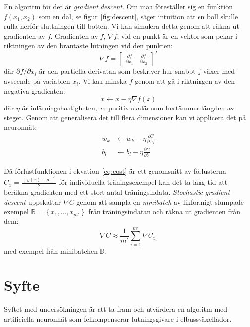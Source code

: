 En algoritm för det är \emph{gradient descent}.
Om man föreställer sig en funktion $ f(x_1, x_2) $ som en dal,
se figur~\ref{fig:descent},
säger intuition att en boll skulle rulla nerför sluttningen till botten.
Vi kan simulera detta genom att räkna ut gradienten av $ f $.
Gradienten av $ f $, $ \nabla f $, vid en punkt är en vektor
som pekar i riktningen av den brantaste lutningen vid den punkten:
\begin{equation}
	\nabla f = \begin{bmatrix} \frac{\partial f}{\partial x_1} & \frac{\partial f}{\partial x_2} \end{bmatrix}^{T}
\end{equation}
där $ \partial f / \partial x_i $ är den partiella derivatan
som beskriver hur snabbt $ f $ växer med avseende på variablen $ x_i $.
Vi kan minska $ f $ genom att gå i riktningen av den negativa gradienten:
\begin{equation}
	x \leftarrow x - \eta \nabla f(x)
\end{equation}
där $ \eta $ är inlärningshastigheten,
en positiv skalär som bestämmer längden av steget.
Genom att generalisera det till flera dimensioner kan vi
applicera det på neuronnät:
\begin{align}
	w_k &\leftarrow w_k - \eta \frac{\partial C}{\partial w_k} \\
	b_l &\leftarrow b_l - \eta \frac{\partial C}{\partial b_l}
\end{align}

Då förlustfunktionen i ekvation~\eqref{eq:cost} är ett genomsnitt av
förlusterna $ C_x = \frac{\lVert y(x) - a \rVert^2}{2} $ för individuella träningsexempel
kan det ta lång tid att beräkna gradienten med ett stort antal träningsindata.
\emph{Stochastic gradient descent} uppskattar $ \nabla C $ genom att
sampla en \emph{minibatch} av likformigt slumpade exempel
$ \mathbb{B} = \left\{ x_1, \dotsc, x_{m'} \right\} $ från träningsindatan
och räkna ut gradienten från dem:
\begin{equation}
	\nabla C \approx \frac{1}{m'} \sum^{m'}_{i=1} \nabla C_{x_i}
\end{equation}
med exempel från minibatchen $ \mathbb{B} $.
\autocite{nielsen15}

\section{Syfte}
Syftet med undersökningen är att ta fram och utvärdera en algoritm med
artificiella neuronnät som felkompenserar lutningsgivare i elbussväxellådor.

